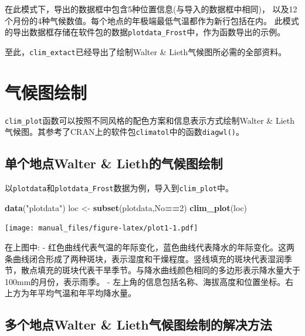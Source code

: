 \documentclass[
]{ctexart}
\newenvironment{Shaded}{\begin{snugshade}}{\end{snugshade}}
\newcommand{\DecValTok}[1]{\textcolor[rgb]{0.00,0.00,0.81}{#1}}
\newcommand{\FunctionTok}[1]{\textcolor[rgb]{0.13,0.29,0.53}{\textbf{#1}}}
\newcommand{\NormalTok}[1]{#1}
\newcommand{\OtherTok}[1]{\textcolor[rgb]{0.56,0.35,0.01}{#1}}
\newcommand{\SpecialCharTok}[1]{\textcolor[rgb]{0.81,0.36,0.00}{\textbf{#1}}}
\newcommand{\StringTok}[1]{\textcolor[rgb]{0.31,0.60,0.02}{#1}}
\begin{document}
\newpage

在此模式下，导出的数据框中包含5种位置信息(与导入的数据框中相同)，
以及12个月份的4种气候数值。每个地点的年极端最低气温都作为新行包括在内。
此模式的导出数据框存储在软件包的数据\texttt{plotdata\_Frost}中，作为函数导出的示例。

至此，\texttt{clim\_extact}已经导出了绘制Walter \&
Lieth气候图所必需的全部资料。

\hypertarget{ux6c14ux5019ux56feux7ed8ux5236}{%
\section{气候图绘制}\label{ux6c14ux5019ux56feux7ed8ux5236}}

\texttt{clim\_plot}函数可以按照不同风格的配色方案和信息表示方式绘制Walter
\&
Lieth气候图。其参考了CRAN上的软件包\texttt{climatol}中的函数\texttt{diagwl()}。

\hypertarget{ux5355ux4e2aux5730ux70b9walter-liethux7684ux6c14ux5019ux56feux7ed8ux5236}{%
\subsection{单个地点Walter \&
Lieth的气候图绘制}\label{ux5355ux4e2aux5730ux70b9walter-liethux7684ux6c14ux5019ux56feux7ed8ux5236}}

以\texttt{plotdata}和\texttt{plotdata\_Frost}数据为例，导入到\texttt{clim\_plot}中。

\begin{Shaded}
\begin{Highlighting}[]
\FunctionTok{data}\NormalTok{(}\StringTok{"plotdata"}\NormalTok{)}
\NormalTok{loc }\OtherTok{\textless{}{-}} \FunctionTok{subset}\NormalTok{(plotdata,No}\SpecialCharTok{==}\DecValTok{2}\NormalTok{)}
\FunctionTok{clim\_plot}\NormalTok{(loc)}
\end{Highlighting}
\end{Shaded}

\texttt{[image: manual\_files/figure-latex/plot1-1.pdf]}

在上图中: -
红色曲线代表气温的年际变化，蓝色曲线代表降水的年际变化。这两条曲线闭合形成了两种斑块，表示湿度和干燥程度。竖线填充的斑块代表湿润季节，散点填充的斑块代表干旱季节。与降水曲线颜色相同的多边形表示降水量大于100mm的月份，表示雨季。
-
左上角的信息包括名称、海拔高度和位置坐标。右上方为年平均气温和年平均降水量。

\hypertarget{ux591aux4e2aux5730ux70b9walter-liethux6c14ux5019ux56feux7ed8ux5236ux7684ux89e3ux51b3ux65b9ux6cd5}{%
\subsection{多个地点Walter \&
Lieth气候图绘制的解决方法}\label{ux591aux4e2aux5730ux70b9walter-liethux6c14ux5019ux56feux7ed8ux5236ux7684ux89e3ux51b3ux65b9ux6cd5}}
\end{document}
